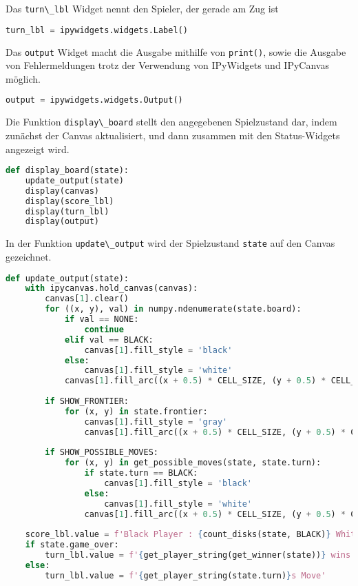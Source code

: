 Das \passthrough{\lstinline!turn\_lbl!} Widget nennt den Spieler, der
gerade am Zug ist

\begin{lstlisting}[language=Python]
turn_lbl = ipywidgets.widgets.Label()
\end{lstlisting}

Das \passthrough{\lstinline!output!} Widget macht die Ausgabe mithilfe
von \passthrough{\lstinline!print()!}, sowie die Ausgabe von
Fehlermeldungen trotz der Verwendung von IPyWidgets und IPyCanvas
möglich.

\begin{lstlisting}[language=Python]
output = ipywidgets.widgets.Output()
\end{lstlisting}

Die Funktion \passthrough{\lstinline!display\_board!} stellt den
angegebenen Spielzustand dar, indem zunächst der Canvas aktualisiert,
und dann zusammen mit den Status-Widgets angezeigt wird.

\begin{lstlisting}[language=Python]
def display_board(state):
    update_output(state)
    display(canvas)
    display(score_lbl)
    display(turn_lbl)
    display(output)
\end{lstlisting}

In der Funktion \passthrough{\lstinline!update\_output!} wird der
Spielzustand \passthrough{\lstinline!state!} auf den Canvas gezeichnet.

\begin{lstlisting}[language=Python]
def update_output(state):
    with ipycanvas.hold_canvas(canvas):
        canvas[1].clear()
        for ((x, y), val) in numpy.ndenumerate(state.board):
            if val == NONE:
                continue
            elif val == BLACK:
                canvas[1].fill_style = 'black'
            else:
                canvas[1].fill_style = 'white'
            canvas[1].fill_arc((x + 0.5) * CELL_SIZE, (y + 0.5) * CELL_SIZE, CELL_SIZE / 2.2, 0, 2 * math.pi)
            
        if SHOW_FRONTIER:
            for (x, y) in state.frontier:
                canvas[1].fill_style = 'gray'
                canvas[1].fill_arc((x + 0.5) * CELL_SIZE, (y + 0.5) * CELL_SIZE, CELL_SIZE / 6, 0, 2 * math.pi)
        
        if SHOW_POSSIBLE_MOVES:
            for (x, y) in get_possible_moves(state, state.turn):
                if state.turn == BLACK:
                    canvas[1].fill_style = 'black'
                else:
                    canvas[1].fill_style = 'white'
                canvas[1].fill_arc((x + 0.5) * CELL_SIZE, (y + 0.5) * CELL_SIZE, CELL_SIZE / 6, 0, 2 * math.pi)
            
    score_lbl.value = f'Black Player : {count_disks(state, BLACK)} White Player : {count_disks(state, WHITE)}'
    if state.game_over:
        turn_lbl.value = f'{get_player_string(get_winner(state))} wins'
    else:
        turn_lbl.value = f'{get_player_string(state.turn)}s Move'
\end{lstlisting}

